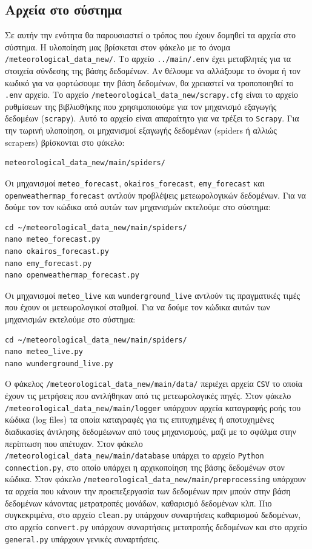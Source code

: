 \documentclass[a4paper,12pt]{article}
\begin{document}
\subsection{Αρχεία στο σύστημα}\label{sec:directory_structure}
Σε αυτήν την ενότητα θα παρουσιαστεί ο τρόπος που έχουν δομηθεί τα αρχεία στο σύστημα. Η υλοποίηση μας βρίσκεται στον φάκελο με το όνομα \texttt{/meteorological\_data\_new/}. Το αρχείο \texttt{../main/.env} έχει μεταβλητές για τα στοιχεία σύνδεσης της βάσης δεδομένων. Αν θέλουμε να αλλάξουμε το όνομα ή τον κωδικό για να φορτώσουμε την βάση δεδομένων, θα χρειαστεί να τροποποιηθεί το \texttt{.env} αρχείο. Το αρχείο \texttt{/meteorological\_data\_new/scrapy.cfg} είναι το αρχείο ρυθμίσεων της βιβλιοθήκης που χρησιμοποιούμε για τον μηχανισμό εξαγωγής δεδομέων (\texttt{scrapy}). Αυτό το αρχείο είναι απαραίτητο για να τρέξει το \texttt{Scrapy}. Για την τωρινή υλοποίηση, οι μηχανισμοί εξαγωγής δεδομένων (spiders ή αλλιώς scrapers) βρίσκονται στο φάκελο: 

\begin{lstlisting}
meteorological_data_new/main/spiders/
\end{lstlisting}

Οι μηχανισμοί \texttt{meteo\_forecast}, \texttt{okairos\_forecast}, \texttt{emy\_forecast} και \texttt{openweathermap\_forecast} αντλούν προβλέψεις μετεωρολογικών δεδομένων. Για να δούμε τον τον κώδικα από αυτών των μηχανισμών εκτελούμε στο σύστημα:

\begin{lstlisting}
cd ~/meteorological_data_new/main/spiders/
nano meteo_forecast.py
nano okairos_forecast.py
nano emy_forecast.py
nano openweathermap_forecast.py
\end{lstlisting}

Οι μηχανισμοί \texttt{meteo\_live} και \texttt{wunderground\_live} αντλούν τις πραγματικές τιμές που έχουν οι μετεωρολογικοί σταθμοί. Για να δούμε τον κώδικα αυτών των μηχανισμών εκτελούμε στο σύστημα:

\begin{lstlisting}
cd ~/meteorological_data_new/main/spiders/
nano meteo_live.py
nano wunderground_live.py
\end{lstlisting}

Ο φάκελος \texttt{/meteorological\_data\_new/main/data/} περιέχει αρχεία \texttt{CSV} το οποία έχουν τις μετρήσεις που αντλήθηκαν από τις μετεωρολογικές πηγές. Στον φάκελο \texttt{/meteorological\_data\_new/main/logger} υπάρχουν αρχεία καταγραφής ροής του κώδικα (log files) τα οποία καταγραφές για τις επιτυχημένες ή αποτυχημένες διαδικασίες άντλησης δεδομέωνων από τους μηχανισμούς, μαζί με το σφάλμα στην περίπτωση που απέτυχαν. Στον φάκελο \texttt{/meteorological\_data\_new/main/database} υπάρχει το αρχείο \texttt{Python} \texttt{connection.py}, στο οποίο υπάρχει η αρχικοποίηση της βάσης δεδομένων στον κώδικα. Στον φάκελο \texttt{/meteorological\_data\_new/main/preprocessing} υπάρχουν τα αρχεία που κάνουν την προεπεξεργασία των δεδομένων πριν μπούν στην βάση δεδομένων κάνοντας μετρατροπές μονάδων, καθαρισμό δεδομένων κλπ. Πιο συγκεκριμένα, στο αρχείο \texttt{clean.py} υπάρχουν συναρτήσεις καθαρισμού δεδομένων, στο αρχείο \texttt{convert.py} υπάρχουν συναρτήσεις μετατροπής δεδομένων και στο αρχείο \texttt{general.py} υπάρχουν γενικές συναρτήσεις.
\end{document}
